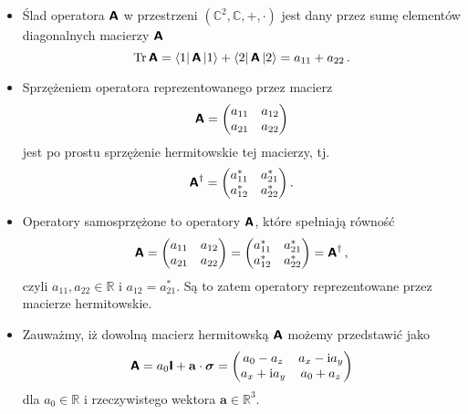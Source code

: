 \documentclass{myclass}
\begin{document}
\begin{itemize}
    
    \item Ślad operatora \(\boldsymbol{\mathsf{A}}\) w przestrzeni \((\mathbb{C}^2,\mathbb{C},+,\cdot)\) jest dany
    przez sumę elementów diagonalnych macierzy \(\boldsymbol{\mathsf{A}}\)
    \begin{equation*}
        \Trace{\oper{A}} = \bra{1}\oper{A}\ket{1} + \bra{2}\oper{A}\ket{2} = a_{11} + a_{22}\,.
    \end{equation*}

    \item Sprzężeniem operatora reprezentowanego przez macierz
    \begin{equation*}
        \oper{A} = \mqty(a_{11} & a_{12} \\ a_{21} & a_{22})
    \end{equation*}
    jest po prostu sprzężenie hermitowskie tej macierzy, tj.
    \begin{equation*}
        \oper{A}^\dagger = \mqty(a^*_{11} & a^*_{21} \\ a^*_{12} & a^*_{22})\,.
    \end{equation*}

    \item Operatory samosprzężone to operatory \(\boldsymbol{\mathsf{A}}\), które spełniają równość
    \begin{equation*}
        \oper{A} = \mqty(a_{11} & a_{12} \\ a_{21} & a_{22}) = \mqty(a^*_{11} & a^*_{21} \\ a^*_{12} & a^*_{22}) = \oper{A}^\dagger\,,
    \end{equation*}
    czyli \(a_{11},a_{22}\in\mathbb{R}\) i \(a_{12} = a_{21}^*\). Są to zatem operatory
    reprezentowane przez macierze hermitowskie.

    \item Zauważmy, iż dowolną macierz hermitowską \(\boldsymbol{\mathsf{A}}\) możemy przedstawić jako
    \begin{equation*}
        \oper{A} = a_0\oper{I} + \mathbf{a}\cdot\boldsymbol{\sigma} =\mqty(a_0-a_z & a_x-\im a_y \\ a_x + \im a_y & a_0 + a_z)
    \end{equation*}
    dla \(a_0\in\mathbb{R}\) i rzeczywistego wektora \(\mathbf{a}\in\mathbb{R}^3\).


\end{itemize}
\end{document}
